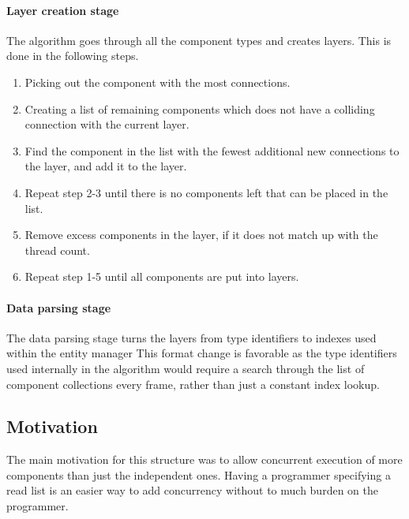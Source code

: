 %

\paragraph{Layer creation stage}
The algorithm goes through all the component types and creates layers.
This is done in the following steps.

\begin{enumerate}
    \item Picking out the component with the most connections.

    \item Creating a list of remaining components which does not have a colliding connection with the current layer.

    \item Find the component in the list with the fewest additional new connections to the layer, and add it to the layer.

    \item Repeat step 2-3 until there is no components left that can be placed in the list.

    \item Remove excess components in the layer, if it does not match up with the thread count.

    \item Repeat step 1-5 until all components are put into layers.
\end{enumerate}

\paragraph{Data parsing stage}
The data parsing stage turns the layers from type identifiers to indexes used within the entity manager
This format change is favorable as the type identifiers used internally in the algorithm would require a search through the list of component collections every frame, rather than just a constant index lookup.

\subsection{Motivation}
The main motivation for this structure was to allow concurrent execution of more components
than just the independent ones.
Having a programmer specifying a read list is an easier way to add concurrency without to much burden on the programmer.

